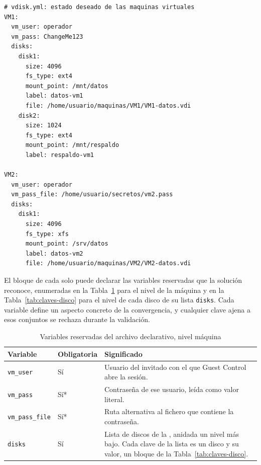 \begin{lstlisting}[caption={Archivo declarativo estándar vdisk.yml}, label={lst:vdisk}]
# vdisk.yml: estado deseado de las maquinas virtuales
VM1:
  vm_user: operador
  vm_pass: ChangeMe123
  disks:
    disk1:
      size: 4096
      fs_type: ext4
      mount_point: /mnt/datos
      label: datos-vm1
      file: /home/usuario/maquinas/VM1/VM1-datos.vdi
    disk2:
      size: 1024
      fs_type: ext4
      mount_point: /mnt/respaldo
      label: respaldo-vm1

VM2:
  vm_user: operador
  vm_pass_file: /home/usuario/secretos/vm2.pass
  disks:
    disk1:
      size: 4096
      fs_type: xfs
      mount_point: /srv/datos
      label: datos-vm2
      file: /home/usuario/maquinas/VM2/VM2-datos.vdi
\end{lstlisting}

El bloque de cada \vm{} solo puede declarar las variables reservadas que la solución reconoce, enumeradas en la Tabla~\ref{tab:claves} para el nivel de la máquina y en la Tabla~\ref{tab:claves-disco} para el nivel de cada disco de su lista \texttt{disks}. Cada variable define un aspecto concreto de la convergencia, y cualquier clave ajena a esos conjuntos se rechaza durante la validación.

\begin{table}[H]
    \centering
    \caption{Variables reservadas del archivo declarativo, nivel máquina}
    \label{tab:claves}
    \begin{tabular}{@{}llp{8.4cm}@{}}
        \toprule
        \textbf{Variable} & \textbf{Obligatoria} & \textbf{Significado} \\
        \midrule
        \texttt{vm\_user} & Sí & Usuario del invitado con el que Guest Control abre la sesión. \\
        \texttt{vm\_pass} & Sí* & Contraseña de ese usuario, leída como valor literal. \\
        \texttt{vm\_pass\_file} & Sí* & Ruta alternativa al fichero que contiene la contraseña. \\
        \texttt{disks} & Sí & Lista de discos de la \vm{}, anidada un nivel más bajo. Cada clave de la lista es un disco y su valor, un bloque de la Tabla~\ref{tab:claves-disco}. \\
        \bottomrule
    \end{tabular}
\end{table}

